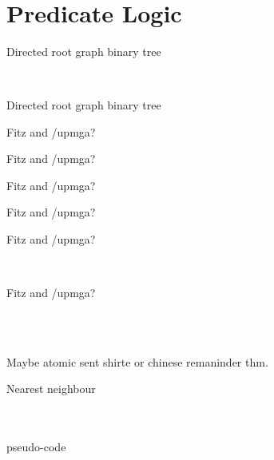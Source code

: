 {\\
\section{Predicate Logic}
\begin{definition}
Directed root graph binary tree
\end{definition}
\\
\begin{theorem}
Directed root graph binary tree
\end{theorem}

\begin{definition}
Fitz and /upmga?
\end{definition}

\begin{definition}
Fitz and /upmga?
\end{definition}

\begin{definition}
Fitz and /upmga?
\end{definition}

\begin{definition}
Fitz and /upmga?
\end{definition}

\begin{definition}
Fitz and /upmga?
\end{definition}
\\
\begin{definition}
Fitz and /upmga?
\end{definition}
\\
\qseven
\\

\begin{definition}
Maybe atomic sent shirte or chinese remaninder thm.
\end{definition}

\begin{definition}

\end{definition}
\begin{definition}

\end{definition}
\begin{theorem}

\end{theorem}
\begin{definition}{Nearest neighbour}

\end{definition}
\\
\qeight
\\
pseudo-code
\\
}



